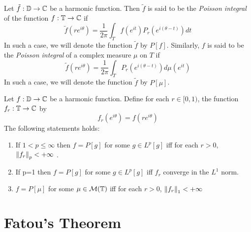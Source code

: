 \begin{definition}
    Let $\tilde{f} : \mathbb D \to \mathbb C$ be a harmonic function. Then $\tilde{f}$ is said to be the \textit{Poisson integral} of the function $f : \mathbb T \to \mathbb C$ if
    \begin{equation*}
	\tilde{f} (re^{i\theta}) = \frac{1}{2\pi} \int_{T} f\left( e^{it} \right) P_{r} \left( e^{i\left( \theta-t \right)} \right) dt
    \end{equation*}
    In such a case, we will denote the function $\tilde{f}$ by $P[f]$.
    Similarly, $f$ is said to be the \textit{Poisson integral} of a complex measure $\mu$ on $T$ if
\begin{equation*}
    \tilde{f} (re^{i\theta}) = \frac{1}{2\pi} \int_{T} P_{r} \left( e^{i\left( \theta-t \right)} \right) d\mu\left( e^{it} \right)
    \end{equation*}In such a case, we will denote the function $\tilde{f}$ by $P[\mu]$.
    \label{def:Poisson-Integral-Of-Some-Function-Or-Measure}
\end{definition}

\begin{theorem}
    Let $f : \mathbb D \to \mathbb C$ be a harmonic function. Define for each $r\in [0,1)$, the function $f_{r} : \mathbb T \to \mathbb C$ by
    \begin{equation*}
	f_{r} \left( e^{i\theta} \right) = f\left( re^{i\theta} \right)
    \end{equation*}
    The following statements holds:
    \begin{enumerate}
	\item If $1 < p \le \infty$ then $f=P[g]$ for some $g \in L^{p} [g]$ iff for each $r > 0$, $\left\lVert f_{r} \right\rVert_{p} < +\infty$ .
	\item If p=1 then $f=P[g]$ for some $g \in L^{p} [g]$ iff $f_{r}$ converge in the $L^{1}$ norm.
	\item $f=P[\mu]$ for some $\mu \in {\cal M} (\mathbb T)$ iff for each $r > 0$, $\left\lVert f_{r} \right\rVert_{1} < +\infty$ 
    \end{enumerate}
    \label{thm:convergence-Poisson}
\end{theorem}
\section{Fatou's Theorem}

